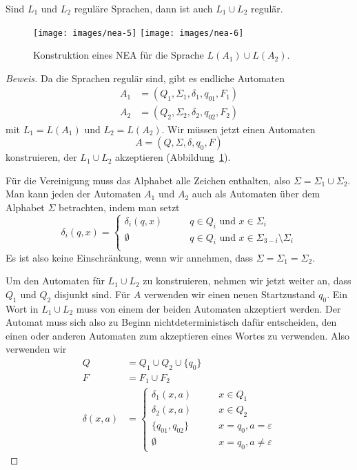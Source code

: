 \begin{satz}
%
\label{satz_union}
Sind $L_1$ und $L_2$ reguläre Sprachen, dann
ist auch $L_1\cup L_2$ regulär.
\end{satz}

\begin{figure}
\begin{center}
\texttt{[image: images/nea-5]}
\qquad \qquad
\texttt{[image: images/nea-6]}
\end{center}
\caption{Konstruktion eines NEA 
für die Sprache $L(A_1)\cup L(A_2)$.\label{regulaer:vereinigung}}
\end{figure}

\begin{proof}[Beweis]
Da die Sprachen regulär sind, gibt es endliche Automaten 
\begin{align*}
A_1&=(Q_1,\Sigma_1,\delta_1, q_{01}, F_1)\\
A_2&=(Q_2,\Sigma_2,\delta_2, q_{02}, F_2)
\end{align*}
mit $L_1=L(A_1)$ und $L_2=L(A_2)$.
Wir müssen
jetzt einen Automaten
\[
A = (Q, \Sigma, \delta, q_0, F)
\]
konstruieren, der $L_1\cup L_2$ akzeptieren
(Abbildung~\ref{regulaer:vereinigung}).

Für die Vereinigung muss das Alphabet alle Zeichen enthalten,
also $\Sigma = \Sigma_1\cup\Sigma_2$.
Man kann jeden der Automaten 
$A_1$ und $A_2$ auch als Automaten über dem Alphabet $\Sigma$
betrachten, indem man setzt
\[
\delta_i(q, x)=\begin{cases}
\delta_i(q,x)&\qquad q\in Q_i\text{ und } x\in \Sigma_i\\
\emptyset&\qquad q\in Q_i\text{ und } x\in \Sigma_{3-i}\setminus \Sigma_i\\
\end{cases}
\]
Es ist also keine Einschränkung, wenn wir annehmen, dass
$\Sigma=\Sigma_1=\Sigma_2$.

Um den Automaten für $L_1\cup L_2$ zu konstruieren, nehmen wir jetzt
weiter an, dass $Q_1$ und $Q_2$ disjunkt sind.
Für $A$ verwenden wir einen neuen Startzustand $q_0$.
Ein Wort in $L_1\cup L_2$ muss von einem der beiden Automaten
akzeptiert werden.
Der Automat muss sich also zu Beginn nichtdeterministisch
dafür entscheiden, den einen oder anderen Automaten zum
akzeptieren eines Wortes zu verwenden.
Also verwenden wir 
\begin{align*}
Q&=Q_1\cup Q_2\cup \{q_0\}\\
F&=F_1\cup F_2\\
\delta(x,a)&=\begin{cases}
\delta_1(x,a)&\qquad x\in Q_1\\
\delta_2(x,a)&\qquad x\in Q_2\\
\{q_{01}, q_{02}\}&\qquad x=q_0, a=\varepsilon\\
\emptyset&\qquad x=q_0, a\ne\varepsilon
\end{cases}
\end{align*}
\end{proof}

